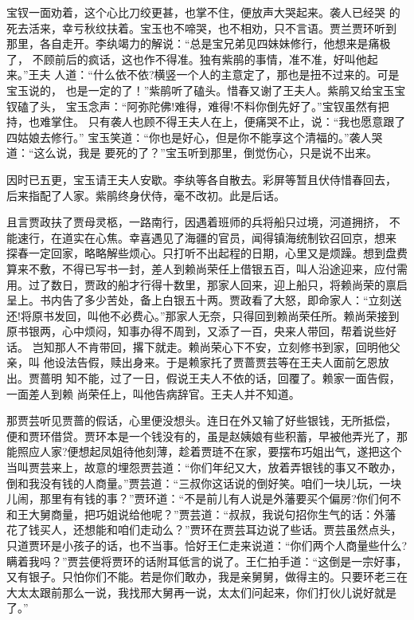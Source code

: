 宝钗一面劝着，这个心比刀绞更甚，也掌不住，便放声大哭起来。袭人已经哭
的死去活来，幸亏秋纹扶着。宝玉也不啼哭，也不相劝，只不言语。贾兰贾环听到
那里，各自走开。李纨竭力的解说：“总是宝兄弟见四妹妹修行，他想来是痛极了，
不顾前后的疯话，这也作不得准。独有紫鹃的事情，准不准，好叫他起来。”王夫
人道：“什么依不依?横竖一个人的主意定了，那也是扭不过来的。可是宝玉说的，
也是一定的了！”紫鹃听了磕头。惜春又谢了王夫人。紫鹃又给宝玉宝钗磕了头，
宝玉念声：“阿弥陀佛!难得，难得!不料你倒先好了。”宝钗虽然有把持，也难掌住。
只有袭人也顾不得王夫人在上，便痛哭不止，说：“我也愿意跟了四姑娘去修行。”
宝玉笑道：“你也是好心，但是你不能享这个清福的。”袭人哭道：“这么说，我是
要死的了？”宝玉听到那里，倒觉伤心，只是说不出来。

因时已五更，宝玉请王夫人安歇。李纨等各自散去。彩屏等暂且伏侍惜春回去，
后来指配了人家。紫鹃终身伏侍，毫不改初。此是后话。

且言贾政扶了贾母灵柩，一路南行，因遇着班师的兵将船只过境，河道拥挤，
不能速行，在道实在心焦。幸喜遇见了海疆的官员，闻得镇海统制钦召回京，想来
探春一定回家，略略解些烦心。只打听不出起程的日期，心里又是烦躁。想到盘费
算来不敷，不得已写书一封，差人到赖尚荣任上借银五百，叫人沿途迎来，应付需
用。过了数日，贾政的船才行得十数里，那家人回来，迎上船只，将赖尚荣的禀启
呈上。书内告了多少苦处，备上白银五十两。贾政看了大怒，即命家人：“立刻送
还!将原书发回，叫他不必费心。”那家人无奈，只得回到赖尚荣任所。赖尚荣接到
原书银两，心中烦闷，知事办得不周到，又添了一百，央来人带回，帮着说些好话。
岂知那人不肯带回，撂下就走。赖尚荣心下不安，立刻修书到家，回明他父亲，叫
他设法告假，赎出身来。于是赖家托了贾蔷贾芸等在王夫人面前乞恩放出。贾蔷明
知不能，过了一日，假说王夫人不依的话，回覆了。赖家一面告假，一面差人到赖
尚荣任上，叫他告病辞官。王夫人并不知道。

那贾芸听见贾蔷的假话，心里便没想头。连日在外又输了好些银钱，无所抵偿，
便和贾环借贷。贾环本是一个钱没有的，虽是赵姨娘有些积蓄，早被他弄光了，那
能照应人家?便想起凤姐待他刻薄，趁着贾琏不在家，要摆布巧姐出气，遂把这个
当叫贾芸来上，故意的埋怨贾芸道：“你们年纪又大，放着弄银钱的事又不敢办，
倒和我没有钱的人商量。”贾芸道：“三叔你这话说的倒好笑。咱们一块儿玩，一块
儿闹，那里有有钱的事？”贾环道：“不是前儿有人说是外藩要买个偏房?你们何不
和王大舅商量，把巧姐说给他呢？”贾芸道：“叔叔，我说句招你生气的话：外藩
花了钱买人，还想能和咱们走动么？”贾环在贾芸耳边说了些话。贾芸虽然点头，
只道贾环是小孩子的话，也不当事。恰好王仁走来说道：“你们两个人商量些什么?
瞒着我吗？”贾芸便将贾环的话附耳低言的说了。王仁拍手道：“这倒是一宗好事，
又有银子。只怕你们不能。若是你们敢办，我是亲舅舅，做得主的。只要环老三在
大太太跟前那么一说，我找邢大舅再一说，太太们问起来，你们打伙儿说好就是了。”

